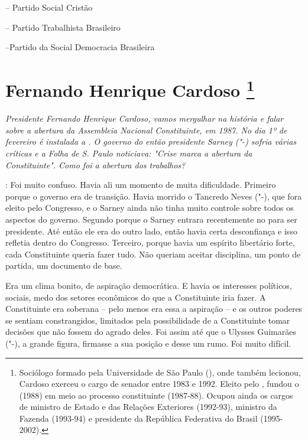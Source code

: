 -- Partido Social Cristão

 -- Partido Trabalhista Brasileiro

 --Partido da Social Democracia Brasileira


\chapter{Fernando Henrique Cardoso
\footnote{Sociólogo formado pela Universidade de São Paulo (), onde também
lecionou, Cardoso exerceu o cargo de senador entre 1983 e 1992. Eleito
pelo , fundou o  (1988) em meio ao processo constituinte
(1987-88). Ocupou ainda os cargos de ministro de Estado e das Relações
Exteriores (1992-93), ministro da Fazenda (1993-94) e presidente da
República Federativa do Brasil (1995-2002).}}

\emph{ Presidente Fernando Henrique Cardoso, vamos mergulhar na
história e falar sobre a abertura da Assembleia Nacional Constituinte,
em 1987. No dia 1º de fevereiro é instalada a . O governo do então
presidente Sarney ("-) sofria várias críticas e a Folha de S. Paulo
noticiava: "Crise marca a abertura da Constituinte". Como foi a abertura
dos trabalhos?}

: Foi muito confuso. Havia ali um
momento de muita dificuldade. Primeiro porque o governo era de
transição. Havia morrido o Tancredo Neves ("-), que fora eleito
pelo Congresso, e o Sarney ainda não tinha muito controle sobre todos os
aspectos do governo. Segundo porque o Sarney entrara recentemente no
 para ser presidente. Até então ele era do outro lado, então havia
certa desconfiança e isso refletia dentro do Congresso. Terceiro, porque
havia um espírito libertário forte, cada Constituinte queria fazer tudo.
Não queriam aceitar disciplina, um ponto de partida, um documento de
base.

Era um clima bonito, de aspiração democrática. E havia os interesses
políticos, sociais, medo dos setores econômicos do que a Constituinte
iria fazer. A Constituinte era soberana -- pelo menos era essa a
aspiração -- e os outros poderes se sentiam constrangidos, limitados
pela possibilidade de a Constituinte tomar decisões que não fossem do
agrado deles. Foi assim até que o Ulysses Guimarães ("-), a grande
figura, firmasse a sua posição e desse um rumo. Foi muito difícil.

